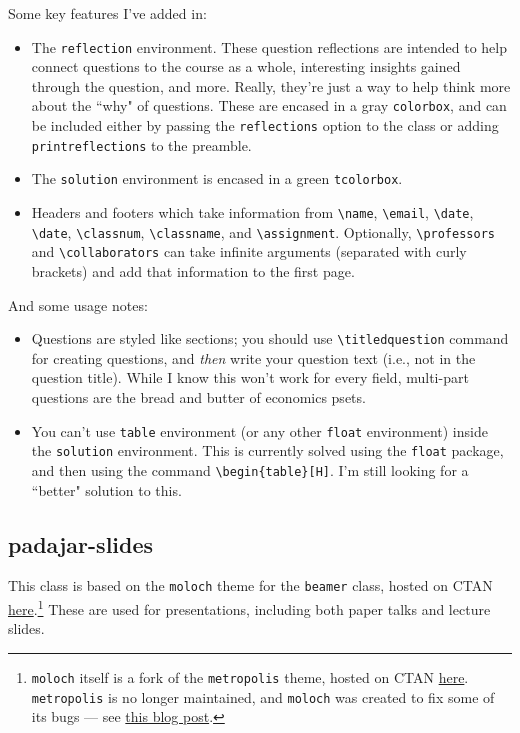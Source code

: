\documentclass[11pt]{padajar-memo}
\newcommand{\ttslash}[1]{\texttt{\textbackslash #1}}
\begin{document}
Some key features I've added in:
\begin{itemize}
	\item The \texttt{reflection} environment. These question reflections are intended to help connect questions to the course as a whole, interesting insights gained through the question, and more. Really, they're just a way to help think more about the ``why" of questions. These are encased in a gray \texttt{colorbox}, and can be included either by passing the \texttt{reflections} option to the class or adding \texttt{printreflections} to the preamble.

	\item The \texttt{solution} environment is encased in a green \texttt{tcolorbox}.

	\item Headers and footers which take information from \ttslash{name}, \ttslash{email}, \ttslash{date}, \ttslash{date}, \ttslash{classnum}, \ttslash{classname}, and \ttslash{assignment}. Optionally, \ttslash{professors} and \ttslash{collaborators} can take infinite arguments (separated with curly brackets) and add that information to the first page.
\end{itemize}

And some usage notes:

\begin{itemize}
	\item Questions are styled like sections; you should use \ttslash{titledquestion} command for creating questions, and \textit{then} write your question text (i.e., not in the question title). While I know this won't work for every field, multi-part questions are the bread and butter of economics psets.
	\item You can't use \texttt{table} environment (or any other \texttt{float} environment) inside the \texttt{solution} environment. This is currently solved using the \texttt{float} package, and then using the command \ttslash{begin\{table\}[H]}. I'm still looking for a ``better" solution to this.
\end{itemize}

\subsection{padajar-slides}
This class is based on the \texttt{moloch} theme for the \texttt{beamer} class, hosted on CTAN \href{https://ctan.org/pkg/moloch}{here}.\footnote{\texttt{moloch} itself is a fork of the \texttt{metropolis} theme, hosted on CTAN \href{https://ctan.org/pkg/beamertheme-metropolis}{here}. \texttt{metropolis} is no longer maintained, and \texttt{moloch} was created to fix some of its bugs --- see \href{https://jolars.co/blog/2024-05-30-moloch/}{this blog post}.} These are used for presentations, including both paper talks and lecture slides.
\end{document}

